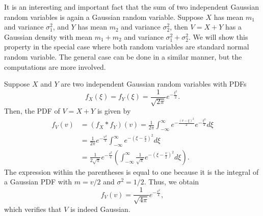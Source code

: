 \begin{example}
It is an interesting and important fact that the sum of two independent Gaussian random variables is again a Gaussian random variable.
Suppose $X$ has mean $m_1$ and variance $\sigma_1^2$, and $Y$ has mean $m_2$ and variance $\sigma_2^2$, then $V = X + Y$ has a Gaussian density with mean $m_1 + m_2$ and variance $\sigma_1^2 + \sigma_2^2$.
We will show this property in the special case where both random variables are standard normal random variable.
The general case can be done in a similar manner, but the computations are more involved.

Suppose $X$ and $Y$ are two independent Gaussian random variables with PDFs
\begin{equation*}
f_X(\xi) = f_Y(\xi) = \frac 1{\sqrt{2\pi}} e^{-\frac{\xi^2}{2}} .
\end{equation*}
Then, the PDF of $V = X + Y$ is given by
\begin{equation*}
\begin{split}
f_V (v) &= (f_X \ast f_Y) (v)
= \frac{1}{2\pi}
\int_{-\infty}^{\infty} e^{-\frac{(v - \xi)^2}{2}} e^{-\frac{\xi^2}{2}} d\xi \\
&= \frac{1}{2\pi} e^{- \frac{v^2}{4}}
\int_{-\infty}^{\infty} e^{- \left( \xi - \frac{v}{2} \right)^2} d\xi \\
&= \frac{1}{2 \sqrt{\pi}} e^{- \frac{v^2}{4}}
\left( \int_{-\infty}^{\infty} \frac{1}{\sqrt{\pi}}
e^{-\left( \xi - \frac{v}{2} \right)^2} d\xi \right) .
\end{split}
\end{equation*}
The expression within the parentheses is equal to one because it is the integral of a Gaussian PDF with $m = v/2$ and $\sigma^2 = 1/2$.
Thus, we obtain
\begin{equation*}
f_V(v) = \frac{1}{\sqrt{4\pi}} e^{-\frac{v^2}{4}} ,
\end{equation*}
which verifies that $V$ is indeed Gaussian.
\end{example}

